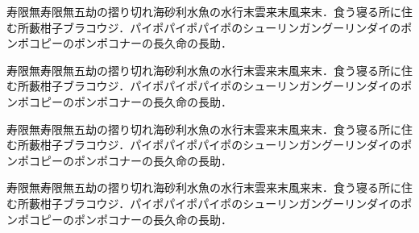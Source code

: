 \documentclass[a4j, 12Q, twocolumn, twoside]{jsarticle}
\begin{document}
寿限無寿限無五劫の摺り切れ海砂利水魚の水行末雲来末風来末．食う寝る所に住む所藪柑子ブラコウジ．パイポパイポパイポのシューリンガングーリンダイのポンポコピーのポンポコナーの長久命の長助．

寿限無寿限無五劫の摺り切れ海砂利水魚の水行末雲来末風来末．食う寝る所に住む所藪柑子ブラコウジ．パイポパイポパイポのシューリンガングーリンダイのポンポコピーのポンポコナーの長久命の長助．

寿限無寿限無五劫の摺り切れ海砂利水魚の水行末雲来末風来末．食う寝る所に住む所藪柑子ブラコウジ．パイポパイポパイポのシューリンガングーリンダイのポンポコピーのポンポコナーの長久命の長助．

寿限無寿限無五劫の摺り切れ海砂利水魚の水行末雲来末風来末．食う寝る所に住む所藪柑子ブラコウジ．パイポパイポパイポのシューリンガングーリンダイのポンポコピーのポンポコナーの長久命の長助．
\end{document}
